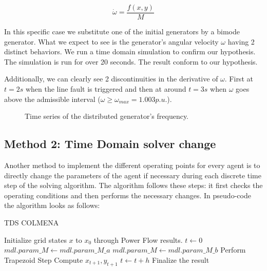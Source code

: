 \documentclass{report}
\begin{document}
\begin{equation}
    \dot{\omega} = \frac{f(x, y)}{M}
\end{equation}

In this specific case we substitute one of the initial generators by a bimode generator. What we expect to see is the generator's angular velocity $\omega$ having 2 distinct behaviors. We run a time domain simulation to confirm our hypothesis. The simulation is run for over 20 seconds. The result conform to our hypothesis. 

Additionally, we can clearly see 2 discontinuities in the derivative of $\omega$. First at $t=2s$ when the line fault is triggered and then at around $t=3s$ when $\omega$ goes above the admissible interval ($\omega \geq \omega_{max} = 1.003 p.u. $).   

\begin{figure}[h]  %
    \centering
    \resizebox{\linewidth}{!}{}

    \caption{Time series of the distributed generator's frequency.}
    \label{fig:sample_figure2}
\end{figure}

\subsection{Method 2: Time Domain solver change}

Another method to implement the different operating points for every agent is to directly change the parameters of the agent if necessary during each discrete time step of the solving algorithm. The algorithm follows these steps: it first checks the operating conditions and then performs the necessary changes. In pseudo-code the algorithm looks as follows: 

\begin{algorithm}
    \caption{TDS COLMENA}
    \begin{algorithmic}[1]
    \State Initialize grid states $x$ to $x_0$ through Power Flow results.
    \State $t \gets 0$
                \State $mdl.param\_M \gets mdl.param\_M\_a$
            \Else 
                \State $mdl.param\_M  \gets mdl.param\_M\_b$
            \EndIf
        \EndFor
        \State Perform Trapezoid Step 
        \State Compute $x_{t+1}, y_{t+1}$
        \State $t \gets t + h$
    \EndWhile
    \State Finalize the result
    \end{algorithmic}
\end{algorithm}
\end{document}
